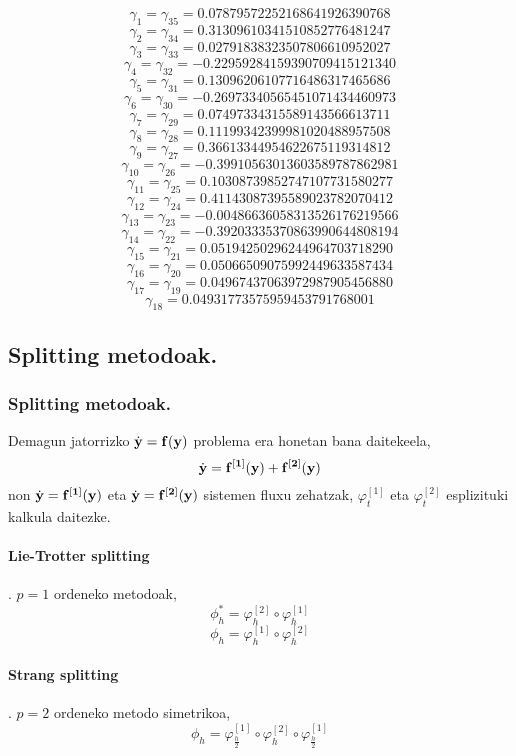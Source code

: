 \[\gamma_1=\gamma_{35}= 0.07879572252168641926390768\] 
\[\gamma_2=\gamma_{34}= 0.31309610341510852776481247\] 
\[\gamma_3=\gamma_{33}= 0.02791838323507806610952027\]
\[\gamma_4=\gamma_{32}= -0.22959284159390709415121340\] 
\[\gamma_5=\gamma_{31}= 0.13096206107716486317465686\] 
\[\gamma_6=\gamma_{30}= -0.26973340565451071434460973\] 
\[\gamma_7=\gamma_{29}= 0.07497334315589143566613711\] 
\[\gamma_8=\gamma_{28}= 0.11199342399981020488957508\] 
\[\gamma_9=\gamma_{27}= 0.36613344954622675119314812\] 
\[\gamma_{10}=\gamma_{26}= -0.39910563013603589787862981\] 
\[\gamma_{11}=\gamma_{25}= 0.10308739852747107731580277\]
\[\gamma_{12}=\gamma_{24}= 0.41143087395589023782070412\] 
\[\gamma_{13}=\gamma_{23}= -0.00486636058313526176219566\] 
\[\gamma_{14}=\gamma_{22}= -0.39203335370863990644808194\] 
\[\gamma_{15}=\gamma_{21}= 0.05194250296244964703718290\] 
\[\gamma_{16}=\gamma_{20}= 0.05066509075992449633587434\] 
\[\gamma_{17}=\gamma_{19}= 0.04967437063972987905456880\] 
\[\gamma_{18}= 0.04931773575959453791768001\]  


\subsection{Splitting metodoak.}

\subsubsection{Splitting metodoak.}

Demagun jatorrizko $\dot{\bf{y}}=\bf{f}(\bf{y})$ problema era honetan bana daitekeela,
\begin{equation}
\dot{\bf{y}}=\bf{f^{[1]}}(\bf{y})+\bf{f^{[2]}}(\bf{y})
\end{equation} 
non $\dot{\bf{y}}=\bf{f^{[1]}}(\bf{y})$ eta $\dot{\bf{y}}=\bf{f^{[2]}}(\bf{y})$ sistemen fluxu zehatzak, $\varphi_t^{[1]}$ eta $\varphi_t^{[2]}$ esplizituki kalkula daitezke. 

\paragraph*{\textbf{Lie-Trotter splitting}}.
$p=1$ ordeneko metodoak,
\[\phi_h^{*} = \varphi_h^{[2]} \circ \varphi_h^{[1]}\]
\begin{equation}
\phi_h = \varphi_h^{[1]} \circ \varphi_h^{[2]}
\end{equation}

\paragraph*{\textbf{Strang splitting}}.
$p=2$ ordeneko metodo simetrikoa,
\begin{equation}
\phi_h =  \varphi_{\frac{h}{2}}^{[1]} \circ \varphi_h^{[2]} \circ \varphi_{\frac{h}{2}}^{[1]}
\end{equation} 

